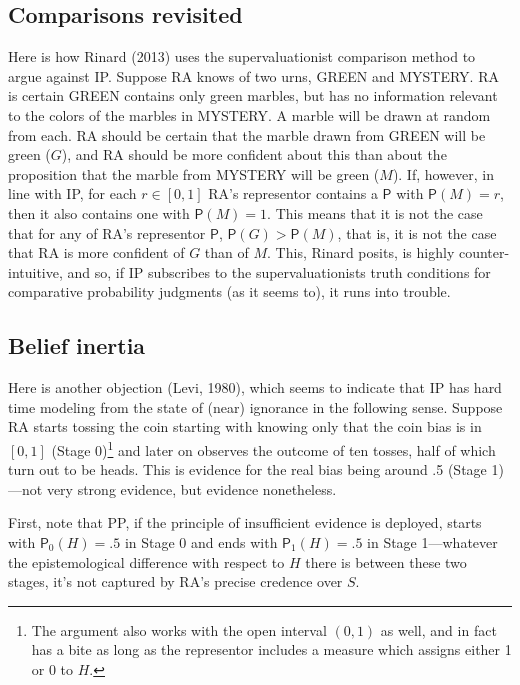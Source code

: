 \documentclass[
  10pt,
  dvipsnames,enabledeprecatedfontcommands]{scrartcl}
\newcommand{\pr}[1]{\mathsf{P}(#1)}
\begin{document}
\hypertarget{comparisons-revisited}{%
\subsection{Comparisons revisited}\label{comparisons-revisited}}

Here is how Rinard (2013) uses the supervaluationist comparison method
to argue against IP. Suppose RA knows of two urns, \textsf{GREEN} and
\textsf{MYSTERY}. RA is certain \textsf{GREEN} contains only green
marbles, but has no information relevant to the colors of the marbles in
\textsf{MYSTERY}. A marble will be drawn at random from each. RA should
be certain that the marble drawn from \textsf{GREEN} will be green
(\(G\)), and RA should be more confident about this than about the
proposition that the marble from \textsf{MYSTERY} will be green (\(M\)).
If, however, in line with IP, for each \(r\in [0,1]\) RA's representor
contains a \(\mathsf{P}\) with \(\pr{M}=r\), then it also contains one
with \(\pr{M}=1\). This means that it is not the case that for any of
RA's representor \(\mathsf{P}\), \(\mathsf{P}(G) > \mathsf{P}(M)\), that
is, it is not the case that RA is more confident of \(G\) than of \(M\).
This, Rinard posits, is highly counter-intuitive, and so, if IP
subscribes to the supervaluationists truth conditions for comparative
probability judgments (as it seems to), it runs into trouble.

\hypertarget{belief-inertia}{%
\subsection{Belief inertia}\label{belief-inertia}}

Here is another objection (Levi, 1980), which seems to indicate that IP
has hard time modeling from the state of (near) ignorance in the
following sense. Suppose RA starts tossing the coin starting with
knowing only that the coin bias is in \([0,1]\) (Stage
0)\footnote{The argument also works with the open interval $(0,1)$ as well, and in fact has a bite as long as the representor includes a measure which assigns either 1 or 0 to $H$.}
and later on observes the outcome of ten tosses, half of which turn out
to be heads. This is evidence for the real bias being around .5 (Stage
1)---not very strong evidence, but evidence nonetheless.

First, note that PP, if the principle of insufficient evidence is
deployed, starts with \(\mathsf{P}_0(H)=.5\) in Stage 0 and ends with
\(\mathsf{P}_1(H)=.5\) in Stage 1---whatever the epistemological
difference with respect to \(H\) there is between these two stages, it's
not captured by RA's precise credence over \(S\).
\end{document}
